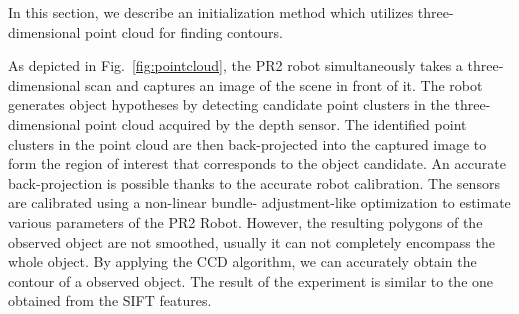 In this section, we describe an initialization method which utilizes three-dimensional
point cloud for finding contours.

As depicted in Fig.~\ref{fig:pointcloud}, the PR2 robot simultaneously takes a three-dimensional scan and captures
an image of the scene in front of it. The robot generates
object hypotheses by detecting candidate point clusters in
the three-dimensional point cloud acquired by the depth sensor. %
The identified point clusters in the
point cloud are then back-projected into the captured image
to form the region of interest that corresponds to the object
candidate. An accurate back-projection is possible thanks to
the accurate robot calibration. The sensors are calibrated using a non-linear bundle-
adjustment-like optimization to estimate various parameters
of the PR2 Robot. However,
the resulting polygons of the observed object are not smoothed,
usually it can not completely encompass the whole object.
By applying the CCD algorithm, we can accurately obtain the contour of
a observed object. The result of the experiment is similar to the one
obtained from the SIFT features.
